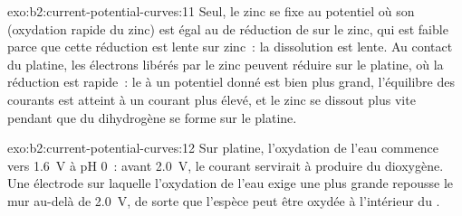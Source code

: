 \begin{solution}{exo:b2:current-potential-curves:11}
Seul, le zinc se fixe au potentiel où son  (oxydation rapide
du zinc) est égal au  de réduction de  sur le zinc,
qui est faible parce que cette réduction est lente sur zinc~: la dissolution est
lente. Au contact du platine, les électrons libérés par le zinc peuvent réduire 
sur le platine, où la réduction est rapide~: le  à un potentiel donné
est bien plus grand, l'équilibre des courants est atteint à un courant plus élevé, et le
zinc se dissout plus vite pendant que du dihydrogène se forme sur le platine.
\end{solution}

\begin{solution}{exo:b2:current-potential-curves:12}
Sur platine, l'oxydation de l'eau commence vers \qty{1.6}{V} à pH 0~: avant
\qty{2.0}{V}, le courant servirait à produire du dioxygène. Une électrode sur laquelle
l'oxydation de l'eau exige une  plus grande repousse le mur au-delà de
\qty{2.0}{V}, de sorte que l'espèce peut être oxydée à l'intérieur du .
\end{solution}

